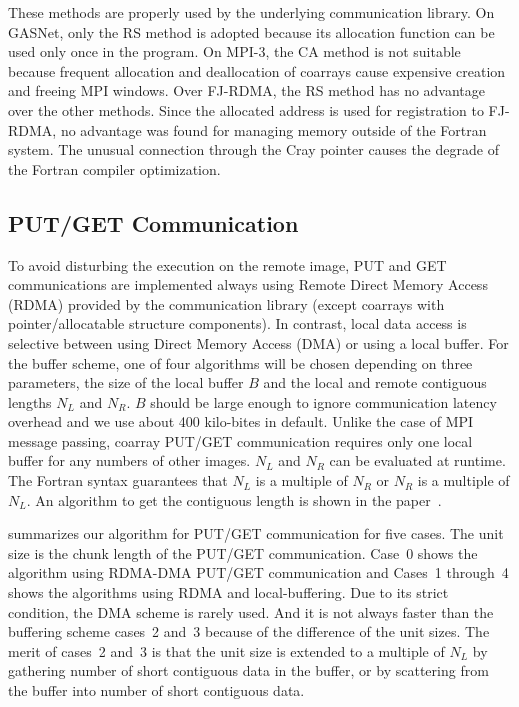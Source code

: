 These methods are properly used by the underlying communication library.
%
On GASNet, only the RS method is adopted because its allocation function
can be used only once in the program.
%
On MPI-3, the CA method is not suitable because frequent 
allocation and deallocation of coarrays cause expensive creation and freeing 
MPI windows.
%
Over FJ-RDMA, the RS method has no advantage over the other methods.
Since the allocated address is used for registration to FJ-RDMA, 
no advantage was found for managing memory outside of the Fortran system. 
The unusual connection through the Cray pointer causes the degrade of 
the Fortran compiler optimization.


\subsection{PUT/GET Communication}

To avoid disturbing the execution on the remote image, PUT and GET communications
are implemented always using Remote Direct Memory Access (RDMA) provided by 
the communication library (except coarrays with pointer/allocatable structure components). 
In contrast, local data access is selective between using Direct Memory Access (DMA) or
using a local buffer. For the buffer scheme, one of four algorithms will be chosen 
depending on three parameters, the size of the local buffer $B$ and the 
local and remote contiguous lengths $N_L$ and $N_R$.
$B$ should be large enough to ignore communication latency overhead and we use
about 400 kilo-bites in default. Unlike the case of MPI message passing,
coarray PUT/GET communication requires only one local buffer for any numbers of
other images.
$N_L$ and $N_R$ can be evaluated at runtime. The Fortran syntax guarantees 
that $N_L$ is a multiple of $N_R$ or $N_R$ is a multiple of $N_L$.
An algorithm to get the contiguous length is shown in the paper~\cite{pgas15}.

 summarizes our algorithm for PUT/GET communication for five cases.
The unit size is the chunk length of the PUT/GET communication.
Case~0 shows the algorithm using RDMA-DMA PUT/GET communication and Cases~1 through~4
shows the algorithms using RDMA and local-buffering. 
Due to its strict condition, the DMA scheme is rarely used.
And it is not always faster than the buffering scheme cases~2 and~3 because of the 
difference of the unit sizes. The merit of cases~2 and~3 is that the unit size 
is extended to a multiple of $N_L$ by gathering number of short contiguous data in the buffer,
or by scattering from the buffer into number of short contiguous data.

